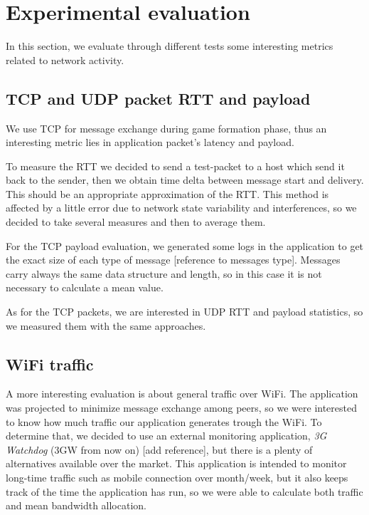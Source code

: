 \section{Experimental evaluation}

In this section, we evaluate through different tests some interesting metrics related to network activity.

\subsection{TCP and UDP packet RTT and payload}

We use TCP for message exchange during game formation phase, thus an interesting metric lies in application packet's latency and payload.
 
To measure the RTT we decided to send a test-packet to a host which send it back to the sender, then we obtain time delta between message start and delivery. This should be an appropriate approximation of the RTT. This method is affected by a little error due to network state variability and interferences, so we decided to take several measures and then to average them.

For the TCP payload evaluation, we generated some logs in the application to get the exact size of each type of message [reference to messages type]. Messages carry always the same data structure and length, so in this case it is not necessary to calculate a mean value.

As for the TCP packets, we are interested in UDP RTT and payload statistics, so we measured them with the same approaches.

\subsection{WiFi traffic}

A more interesting evaluation is about general traffic over WiFi. The application was projected to minimize message exchange among peers, so we were interested to know how much traffic our application generates trough the WiFi. To determine that, we decided to use an external monitoring application, \textit{3G Watchdog} (3GW from now on) [add reference], but there is a plenty of alternatives available over the market. This application is intended to monitor long-time traffic such as mobile connection over month/week, but it also keeps track of the time the application has run, so we were able to calculate both traffic and mean bandwidth allocation.

